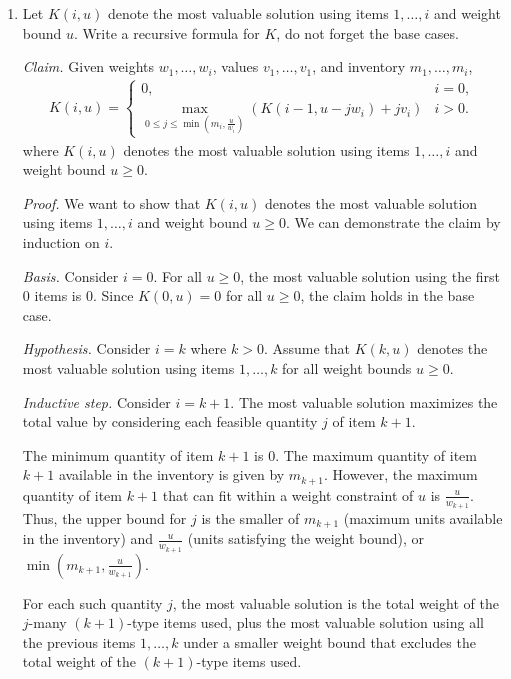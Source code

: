 \begin{enumerate}
    \item Let $K(i,u)$ denote the most valuable solution using items $1,\ldots,i$ and weight bound $u$. Write a recursive formula for $K$, do not forget the base cases.

\begin{solution}
\textit{Claim. }Given weights $w_1,\dots,w_i$, values $v_1,\dots,v_1$, and inventory $m_1,\dots,m_i$,
\begin{align*}
K(i,u)=\begin{cases}
0,&i=0,\\
{\underset{0\leq j\leq\min\left(m_i,\frac{u}{w_i}\right)}{\max}}\left(K(i-1,u-jw_i)+jv_i\right)&i>0.
\end{cases}
\end{align*}
where $K(i,u)$ denotes the most valuable solution using items $1,\dots,i$ and weight bound $u\geq 0$. 

\textit{Proof. }We want to show that $K(i,u)$ denotes the most valuable solution using items $1,\dots,i$ and weight bound $u\geq 0$. We can demonstrate the claim by induction on $i$.

\textit{Basis. }Consider $i=0$. For all $u\geq 0$, the most valuable solution using the first $0$ items is $0$. Since $K(0,u)=0$ for all $u\geq 0$, the claim holds in the base case.

\textit{Hypothesis. }Consider $i=k$ where $k>0$. Assume that $K(k,u)$ denotes the most valuable solution using items $1,\dots,k$ for all weight bounds $u\geq 0$.

\textit{Inductive step. }Consider $i=k+1$. The most valuable solution maximizes the total value by considering each feasible quantity $j$ of item $k+1$.

The minimum quantity of item $k+1$ is $0$. The maximum quantity of item $k+1$ available in the inventory is given by $m_{k+1}$. However, the maximum quantity of item $k+1$ that can fit within a weight constraint of $u$ is $\frac{u}{w_{k+1}}$. Thus, the upper bound for $j$ is the smaller of $m_{k+1}$ (maximum units available in the inventory) and $\frac{u}{w_{k+1}}$ (units satisfying the weight bound), or $\min\left(m_{k+1},\frac{u}{w_{k+1}}\right)$.

For each such quantity $j$, the most valuable solution is the total weight of the $j$-many $(k+1)$-type items used, plus the most valuable solution using all the previous items $1,\dots,k$ under a smaller weight bound that excludes the total weight of the $(k+1)$-type items used. 


\end{solution}
\end{enumerate}
